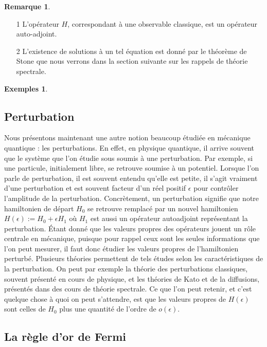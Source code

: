 \documentclass[12pt,openany,a4paper, titlepage]{article}
\theoremstyle{definition}
\theoremstyle{definition}
\theoremstyle{definition}
\theoremstyle{definition}
\newtheorem{exs}{Exemples}
\theoremstyle{definition}
\newtheorem{rem}{Remarque}
\theoremstyle{definition}
\begin{document}
\begin{rem}
    \begin{enumerate}
        \item[1] L'opérateur $H$, correspondant à une observable classique, est un opérateur auto-adjoint.
        \item[2] L'existence de solutions à un tel équation est donné par le théorème de Stone que nous verrons dans la section suivante sur les rappels de théorie spectrale.
    \end{enumerate}
\end{rem}

\begin{exs}
    
\end{exs}

\subsection{Perturbation}

Nous présentons maintenant une autre notion beaucoup étudiée en mécanique quantique : les perturbations.
En effet, en physique quantique, il arrive souvent que le système que l'on étudie sous soumis à une perturbation. Par exemple, si une particule, initialement libre, se retrouve soumise à un potentiel. Lorsque l'on parle de perturbation, il est souvent entendu qu'elle est petite, il s'agit vraiment d'une perturbation et est souvent facteur d'un réel positif $\epsilon$ pour contrôler l'amplitude de la perturbation.
Concrètement, un perturbation signifie que notre hamiltonien de départ $H_0$ se retrouve remplacé par un nouvel hamiltonien $H(\epsilon) := H_0 + \epsilon H_1$ où $H_1$ est aussi un opérateur autoadjoint représentant la perturbation. Étant donné que les valeurs propres des opérateurs jouent un rôle centrale en mécanique, puisque pour rappel ceux sont les seules informations que l'on peut mesurer, il faut donc étudier les valeurs propres de l'hamiltonien perturbé. Plusieurs théories permettent de tels études selon les caractéristiques de la perturbation. On peut par exemple la théorie des perturbations classiques, souvent présenté en cours de physique, et les théories de Kato et de la diffusions, présentés dans des cours de théorie spectrale. Ce que l'on peut retenir, et c'est quelque chose à quoi on peut s'attendre, est que les valeurs propres de $H(\epsilon)$ sont celles de $H_0$ plus une quantité de l'ordre de $o(\epsilon)$. 


\subsection{La règle d'or de Fermi} 
\end{document}
